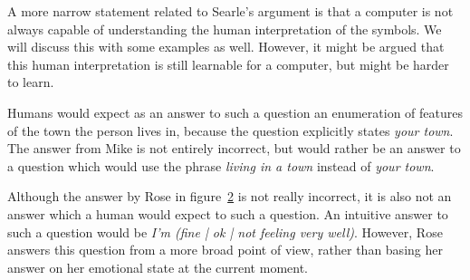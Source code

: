 A more narrow statement related to Searle's argument is that a computer is not always capable of understanding the human interpretation of the symbols. We will discuss this with some examples as well. However, it might be argued that this human interpretation is still learnable for a computer, but might be harder to learn.

\begin{figure}[ht]
   \begin{center}
   \end{center}
   \label{Example3}
\end{figure}

Humans would expect as an answer to such a question an enumeration of features of the town the person lives in, because the question explicitly states \textit{your town}. The answer from Mike is not entirely incorrect, but would rather be an answer to a question which would use the phrase \textit{living in a town} instead of \textit{your town}.

\begin{figure}[ht]
   \begin{center}
   \end{center}
   \label{Example4}
\end{figure}

Although the answer by Rose in figure~\ref{Example4} is not really incorrect, it is also not an answer which a human would expect to such a question. An intuitive answer to such a question would be \textit{I'm (fine | ok | not feeling very well)}. However, Rose answers this question from a more broad point of view, rather than basing her answer on her emotional state at the current moment.

